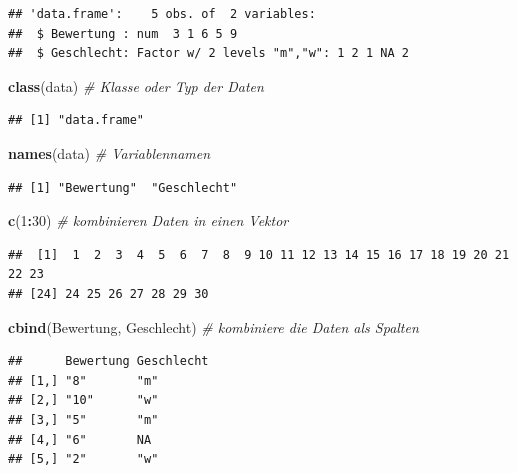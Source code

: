 \documentclass[10pt,ngerman,onside]{article}
\newenvironment{Shaded}{\begin{snugshade}}{\end{snugshade}}
\newcommand{\KeywordTok}[1]{\textcolor[rgb]{0.13,0.29,0.53}{\textbf{#1}}}
\newcommand{\DecValTok}[1]{\textcolor[rgb]{0.00,0.00,0.81}{#1}}
\newcommand{\CommentTok}[1]{\textcolor[rgb]{0.56,0.35,0.01}{\textit{#1}}}
\newcommand{\OperatorTok}[1]{\textcolor[rgb]{0.81,0.36,0.00}{\textbf{#1}}}
\newcommand{\NormalTok}[1]{#1}
\begin{document}
\begin{verbatim}
## 'data.frame':    5 obs. of  2 variables:
##  $ Bewertung : num  3 1 6 5 9
##  $ Geschlecht: Factor w/ 2 levels "m","w": 1 2 1 NA 2
\end{verbatim}

\begin{Shaded}
\begin{Highlighting}[]
\KeywordTok{class}\NormalTok{(data) }\CommentTok{# Klasse oder Typ der Daten}
\end{Highlighting}
\end{Shaded}

\begin{verbatim}
## [1] "data.frame"
\end{verbatim}

\begin{Shaded}
\begin{Highlighting}[]
\KeywordTok{names}\NormalTok{(data) }\CommentTok{# Variablennamen}
\end{Highlighting}
\end{Shaded}

\begin{verbatim}
## [1] "Bewertung"  "Geschlecht"
\end{verbatim}

\begin{Shaded}
\begin{Highlighting}[]
\KeywordTok{c}\NormalTok{(}\DecValTok{1}\OperatorTok{:}\DecValTok{30}\NormalTok{) }\CommentTok{# kombinieren Daten in einen Vektor}
\end{Highlighting}
\end{Shaded}

\begin{verbatim}
##  [1]  1  2  3  4  5  6  7  8  9 10 11 12 13 14 15 16 17 18 19 20 21 22 23
## [24] 24 25 26 27 28 29 30
\end{verbatim}

\begin{Shaded}
\begin{Highlighting}[]
\KeywordTok{cbind}\NormalTok{(Bewertung, Geschlecht) }\CommentTok{# kombiniere die Daten als Spalten}
\end{Highlighting}
\end{Shaded}

\begin{verbatim}
##      Bewertung Geschlecht
## [1,] "8"       "m"       
## [2,] "10"      "w"       
## [3,] "5"       "m"       
## [4,] "6"       NA        
## [5,] "2"       "w"
\end{verbatim}
\end{document}
